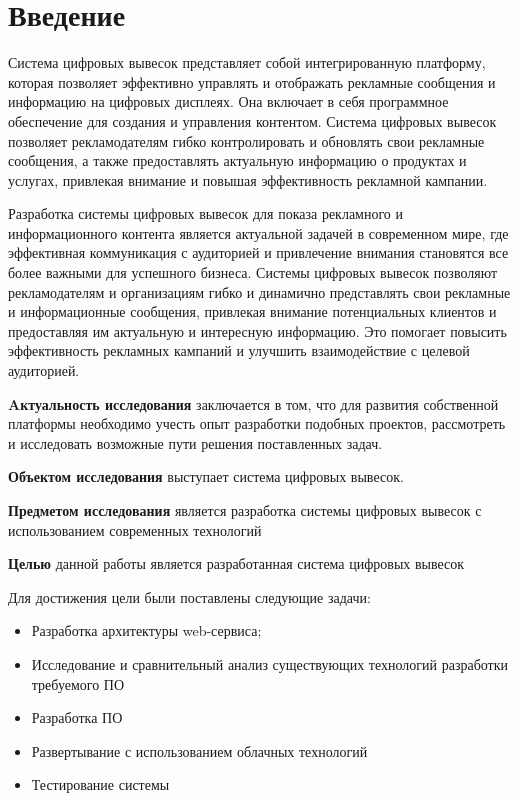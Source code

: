 \chapter*{Введение} %

Система цифровых вывесок представляет собой интегрированную платформу, которая позволяет эффективно управлять и отображать рекламные сообщения и информацию на цифровых дисплеях.
Она включает в себя программное обеспечение для создания и управления контентом.
Система цифровых вывесок позволяет рекламодателям гибко контролировать и обновлять свои рекламные сообщения, а также предоставлять актуальную информацию о продуктах и услугах, привлекая внимание и повышая эффективность рекламной кампании.

Разработка системы цифровых вывесок для показа рекламного и информационного контента является актуальной задачей в современном мире, где эффективная коммуникация с аудиторией и привлечение внимания становятся все более важными для успешного бизнеса.
Системы цифровых вывесок позволяют рекламодателям и организациям гибко и динамично представлять свои рекламные и информационные сообщения, привлекая внимание потенциальных клиентов и предоставляя им актуальную и интересную информацию. Это помогает повысить эффективность рекламных кампаний и улучшить взаимодействие с целевой аудиторией.

\textbf{Aктуальность исследования} заключается в том, что для развития собственной платформы необходимо учесть опыт разработки подобных проектов,
рассмотреть и исследовать возможные пути решения поставленных задач.

\textbf{Объектом исследования} выступает система цифровых вывесок.

\textbf{Предметом исследования} является разработка системы цифровых вывесок с использованием современных технологий

\textbf{Целью} данной работы является разработанная система цифровых вывесок

Для достижения цели были поставлены следующие задачи:

\begin{itemize}
	\item Разработка архитектуры web-сервиса;
    \item Исследование и сравнительный анализ существующих технологий разработки требуемого ПО
    \item Разработка ПО
    \item Развертывание с использованием облачных технологий
    \item Тестирование системы
\end{itemize}

